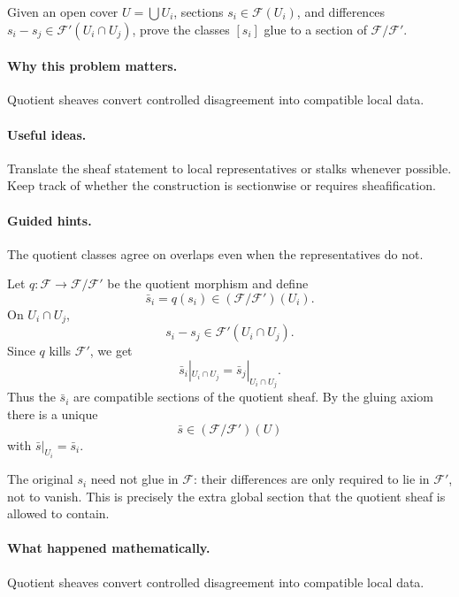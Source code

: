 \begin{problem}\label{prob:vi15-p19}
Given an open cover $U=\bigcup U_i$, sections $s_i\in\mathcal F(U_i)$, and differences $s_i-s_j\in\mathcal F'(U_i\cap U_j)$, prove the classes $[s_i]$ glue to a section of $\mathcal F/\mathcal F'$.
\end{problem}

\ifdefined\FullProblemDossiers
\paragraph{Why this problem matters.}
Quotient sheaves convert controlled disagreement into compatible local data.

\paragraph{Useful ideas.}
Translate the sheaf statement to local representatives or stalks whenever possible.  Keep track of whether the construction is sectionwise or requires sheafification.

\paragraph{Guided hints.}
The quotient classes agree on overlaps even when the representatives do not.

\begin{solution}
Let $q:\mathcal F\to\mathcal F/\mathcal F'$ be the quotient morphism and define
\[
\bar s_i=q(s_i)\in(\mathcal F/\mathcal F')(U_i).
\]
On $U_i\cap U_j$,
\[
s_i-s_j\in\mathcal F'(U_i\cap U_j).
\]
Since $q$ kills $\mathcal F'$, we get
\[
\bar s_i|_{U_i\cap U_j}=\bar s_j|_{U_i\cap U_j}.
\]
Thus the $\bar s_i$ are compatible sections of the quotient sheaf. By the gluing axiom there is a unique
\[
\bar s\in(\mathcal F/\mathcal F')(U)
\]
with $\bar s|_{U_i}=\bar s_i$.

The original $s_i$ need not glue in $\mathcal F$: their differences are only required to lie in $\mathcal F'$, not to vanish. This is precisely the extra global section that the quotient sheaf is allowed to contain.
\end{solution}

\paragraph{What happened mathematically.}
Quotient sheaves convert controlled disagreement into compatible local data.

